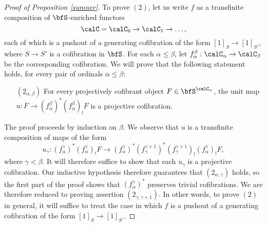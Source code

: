 \begin{proof}[Proof of Proposition \ref{sumner}]
To prove $(2)$, let us write $f$ as a transfinite composition of $\bfS$-enriched functors
$$ \calC = \calC_0 \rightarrow \calC_1 \rightarrow \ldots, $$
each of which is a pushout of a generating cofibration of the form $[1]_{S} \rightarrow [1]_{S'}$, where
$S \rightarrow S'$ is a cofibration in $\bfS$. 
For each $\alpha \leq \beta$, let $f^{\beta}_{\alpha}: \calC_{\alpha} \rightarrow \calC_{\beta}$
be the corresponding cofibration. We will prove that the following statement holds, for
every pair of ordinals $\alpha \leq \beta$:
\begin{itemize}
\item[$(2_{\alpha,\beta})$] For every projectively cofibrant object $F \in \bfS^{\calC_{\alpha} }$,
the unit map $u: F \rightarrow (f_{\alpha}^{\beta})^{\ast} (f_{\alpha}^{\beta})_{!} F$
is a projective cofibration.
\end{itemize}

The proof proceeds by induction on $\beta$. We observe that $u$ is a transfinite
composition of maps of the form
$$ u_{\gamma}: (f_{\alpha}^{\gamma})^{\ast} (f_{\alpha}^{\gamma})_{!} F \rightarrow
(f_{\alpha}^{\gamma})^{\ast} (f_{\gamma}^{\gamma+1})^{\ast}
(f_{\gamma}^{\gamma+1})_{!} (f_{\alpha}^{\gamma})_{!} F,$$
where $\gamma < \beta$. It will therefore suffice to show that each $u_{\gamma}$ is a projective cofibration. Our inductive hypothesis therefore guarantees that
$(2_{\alpha, \gamma})$ holds, so the first part of the proof shows that
$(f_{\alpha}^{\gamma})^{\ast}$ preserves trivial cofibrations. We are therefore reduced to proving
assertion $(2_{\gamma, \gamma+1})$. In other words, to prove $(2)$ in general, it will suffice to
treat the case in which $f$ is a pushout of a generating cofibration of the form $[1]_{S} \rightarrow [1]_{S'}$. 


\end{proof}
